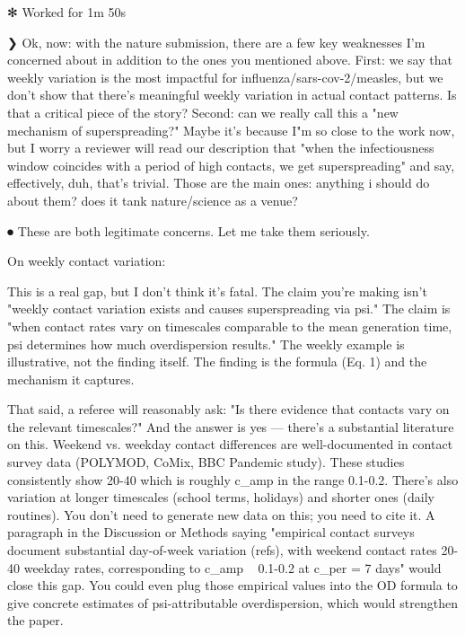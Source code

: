 {{✻ Worked for 1m 50s

❯ Ok, now: with the nature submission, there are a few key weaknesses I'm concerned about in
  addition to the ones you mentioned above. First: we say that weekly variation is the most
  impactful for influenza/sars-cov-2/measles, but we don't show that there's meaningful weekly
  variation in actual contact patterns. Is that a critical piece of the story? Second: can we
  really call this a "new mechanism of superspreading?" Maybe it's because I"m so close to the
  work now, but I worry a reviewer will read our description that "when the infectiousness
  window coincides with a period of high contacts, we get superspreading" and say, effectively,
  duh, that's trivial. Those are the main ones: anything i should do about them? does it tank
  nature/science as a venue?

⏺ These are both legitimate concerns. Let me take them seriously.

  On weekly contact variation:

  This is a real gap, but I don't think it's fatal. The claim you're making isn't "weekly contact
  variation exists and causes superspreading via psi." The claim is "when contact rates vary on
  timescales comparable to the mean generation time, psi determines how much overdispersion results."
   The weekly example is illustrative, not the finding itself. The finding is the formula (Eq. 1) and
   the mechanism it captures.

  That said, a referee will reasonably ask: "Is there evidence that contacts vary on the relevant
  timescales?" And the answer is yes --- there's a substantial literature on this. Weekend vs.
  weekday contact differences are well-documented in contact survey data (POLYMOD, CoMix, BBC
  Pandemic study). These studies consistently show 20-40%
  which is roughly c_amp in the range 0.1-0.2. There's also variation at longer timescales (school
  terms, holidays) and shorter ones (daily routines). You don't need to generate new data on this;
  you need to cite it. A paragraph in the Discussion or Methods saying "empirical contact surveys
  document substantial day-of-week variation (refs), with weekend contact rates 20-40%
  weekday rates, corresponding to c_amp ~ 0.1-0.2 at c_per = 7 days" would close this gap. You could
  even plug those empirical values into the OD formula to give concrete estimates of psi-attributable
   overdispersion, which would strengthen the paper.

}}
